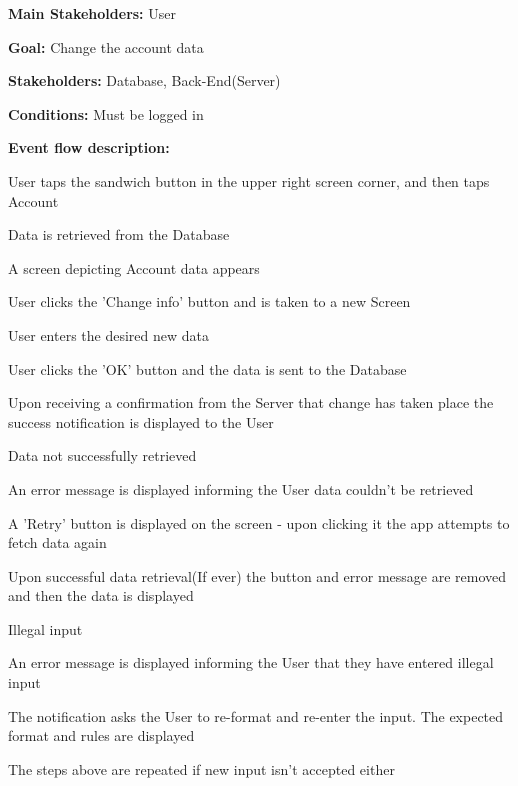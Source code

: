 				\noindent {}
				\begin{packed_item}
					\item \textbf{Main Stakeholders:} User
					\item \textbf{Goal:} Change the account data
					\item \textbf{Stakeholders:} Database, Back-End(Server)
					\item \textbf{Conditions:} Must be logged in
					\item \textbf{Event flow description: }
					\begin{packed_enum}
						\item User taps the sandwich button in the upper right screen corner, and then taps Account
						\item Data is retrieved from the Database
						\item A screen depicting Account data appears
						\item User clicks the 'Change info' button and is taken to a new Screen
						\item User enters the desired new data
						\item User clicks the 'OK' button and the data is sent to the Database
						\item Upon receiving a confirmation from the Server that change has taken place the success notification is displayed to the User
					\end{packed_enum}
					
					\begin{packed_item}
						\item[2.a] Data not successfully retrieved
						\item[] \begin{packed_enum}
							\item An error message is displayed informing the User data couldn't be retrieved
							\item A 'Retry' button is displayed on the screen - upon clicking it the app attempts to fetch data again
							\item Upon successful data retrieval(If ever) the button and error message are removed and then the data is displayed
						\end{packed_enum}

						\item[2.a] Illegal input
						\item[] \begin{packed_enum}
							\item An error message is displayed informing the User that they have entered illegal input
							\item The notification asks the User to re-format and re-enter the input. The expected format and rules are displayed
							\item The steps above are repeated if new input isn't accepted either
						\end{packed_enum}


\end{packed_item}
\end{packed_item}
